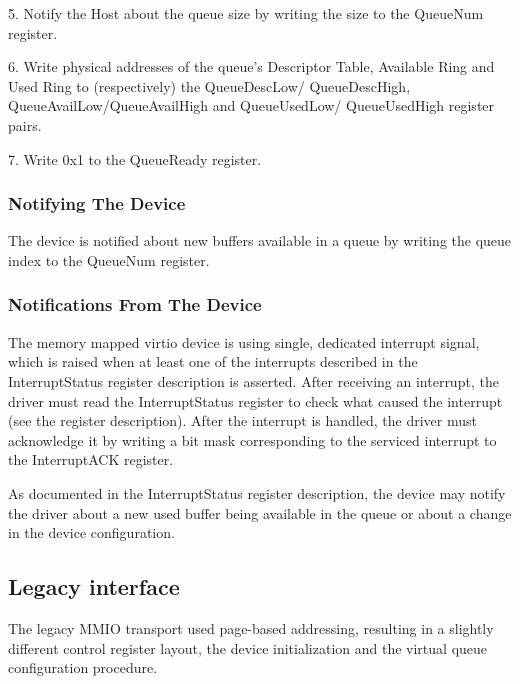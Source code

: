 5. Notify the Host about the queue size by writing the size to
   the QueueNum register.

6. Write physical addresses of the queue's Descriptor Table,
   Available Ring and Used Ring to (respectively) the QueueDescLow/
   QueueDescHigh, QueueAvailLow/QueueAvailHigh and QueueUsedLow/
   QueueUsedHigh register pairs.

7. Write 0x1 to the QueueReady register.

\subsubsection{Notifying The Device}\label{sec:Virtio Transport Options / Virtio Over MMIO / MMIO-specific Initialization And Device Operation / Notifying The Device}

The device is notified about new buffers available in a queue by
writing the queue index to the QueueNum register.

\subsubsection{Notifications From The Device}\label{sec:Virtio Transport Options / Virtio Over MMIO / MMIO-specific Initialization And Device Operation / Notifications From The Device}

The memory mapped virtio device is using single, dedicated
interrupt signal, which is raised when at least one of the
interrupts described in the InterruptStatus register
description is asserted. After receiving an interrupt, the
driver must read the InterruptStatus register to check what
caused the interrupt (see the register description). After the
interrupt is handled, the driver must acknowledge it by writing
a bit mask corresponding to the serviced interrupt to the
InterruptACK register.

As documented in the InterruptStatus register description,
the device may notify the driver about a new used buffer being
available in the queue or about a change in the device
configuration.

\subsection{Legacy interface}\label{sec:Virtio Transport Options / Virtio Over MMIO / Legacy interface}

The legacy MMIO transport used page-based addressing, resulting
in a slightly different control register layout, the device
initialization and the virtual queue configuration procedure.

